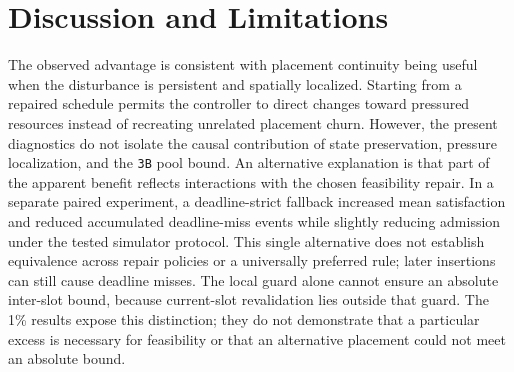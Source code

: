 \documentclass[preprint,12pt]{elsarticle}
\begin{document}
\section{Discussion and Limitations}\label{discussion-and-limitations}

The observed advantage is consistent with placement continuity being
useful when the disturbance is persistent and spatially localized.
Starting from a repaired schedule permits the controller to direct
changes toward pressured resources instead of recreating unrelated
placement churn. However, the present diagnostics do not isolate the
causal contribution of state preservation, pressure localization, and
the \texttt{3B} pool bound. An alternative explanation is that part of
the apparent benefit reflects interactions with the chosen feasibility
repair. In a separate paired experiment, a deadline-strict fallback
increased mean satisfaction and reduced accumulated deadline-miss events
while slightly reducing admission under the tested simulator protocol.
This single alternative does not establish equivalence across repair
policies or a universally preferred rule; later insertions can still cause
deadline misses. The local guard alone cannot ensure an absolute inter-slot
bound, because current-slot revalidation lies outside that guard. The 1\%
results expose this distinction; they do not demonstrate that a particular
excess is necessary for feasibility or that an alternative placement
could not meet an absolute bound.
\end{document}
